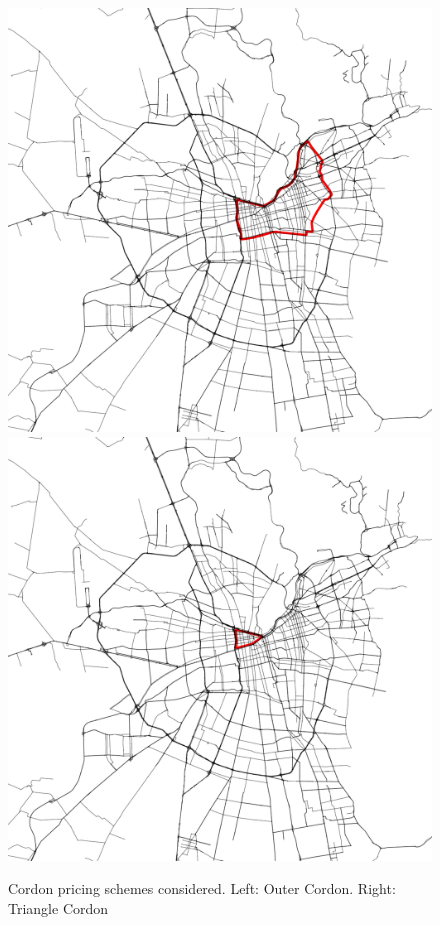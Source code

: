 \documentclass[Journal,letterpaper]{ascelike-new}
\begin{document}
\begin{figure}[h!]
	\centering
	\includegraphics[scale=0.22]{images/outerCordon.pdf}\hspace{3cm}
	\includegraphics[scale=0.22]{images/triangleCordon.pdf}
	\caption{Cordon pricing schemes considered. Left: Outer Cordon. Right: Triangle Cordon}
	\label{fig:congestion_pricing_schemes}
\end{figure}
\end{document}
